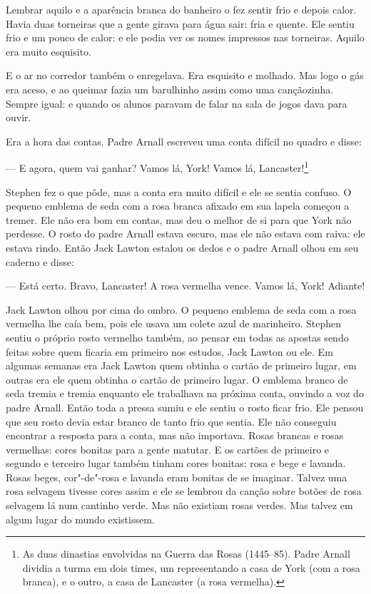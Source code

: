 Lembrar aquilo e a aparência branca do banheiro o fez sentir frio e
depois calor. Havia duas torneiras que a gente girava para água sair:
fria e quente. Ele sentiu frio e um pouco de calor: e ele podia ver os
nomes impressos nas torneiras. Aquilo era muito esquisito.

E o ar no corredor também o enregelava. Era esquisito e molhado. Mas
logo o gás era aceso, e ao queimar fazia um barulhinho assim como uma
cançãozinha. Sempre igual: e quando os alunos paravam de falar na sala
de jogos dava para ouvir.

Era a hora das contas. Padre Arnall escreveu uma conta difícil no quadro
e disse:

 --- E agora, quem vai ganhar? Vamos lá, York! Vamos lá,
Lancaster!\footnote{ As duas dinastias envolvidas na Guerra das Rosas
(1445--85). Padre Arnall dividia a turma em dois times, um representando
a casa de York (com a rosa branca), e o outro, a casa de Lancaster (a
rosa vermelha).}

Stephen fez o que pôde, mas a conta era muito difícil e ele se sentia
confuso. O pequeno emblema de seda com a rosa branca afixado em sua
lapela começou a tremer. Ele não era bom em contas, mas deu o melhor de
si para que York não perdesse. O rosto do padre Arnall estava escuro, 
mas ele não estava com raiva: ele estava rindo. Então Jack Lawton
estalou os dedos e o padre Arnall olhou em seu caderno e disse:

 --- Está certo. Bravo, Lancaster! A rosa vermelha vence. Vamos lá, York!
Adiante!

Jack Lawton olhou por cima do ombro. O pequeno emblema de seda com a
rosa vermelha lhe caía bem, pois ele usava um colete azul de
marinheiro. Stephen sentiu o próprio rosto vermelho também, ao pensar
em todas as apostas sendo feitas sobre quem ficaria em primeiro nos
estudos, Jack Lawton ou ele. Em algumas semanas era Jack Lawton quem
obtinha o cartão de primeiro lugar, em outras era ele quem obtinha o
cartão de primeiro lugar. O emblema branco de seda tremia e tremia
enquanto ele trabalhava na próxima conta, ouvindo a voz do padre
Arnall. Então toda a pressa sumiu e ele sentiu o rosto ficar frio. Ele
pensou que seu rosto devia estar branco de tanto frio que sentia. Ele
não conseguiu encontrar a resposta para a conta, mas não importava. Rosas
brancas e rosas vermelhas: cores bonitas para a gente matutar. E os 
cartões de primeiro e segundo e terceiro lugar também tinham cores
bonitas: rosa e bege e lavanda. Rosas beges, cor"-de"-rosa e lavanda eram
bonitas de se imaginar. Talvez uma rosa selvagem tivesse cores assim e
ele se lembrou da canção sobre botões de rosa selvagem lá num cantinho
verde. Mas não existiam rosas verdes. Mas talvez em algum lugar do
mundo existissem.

